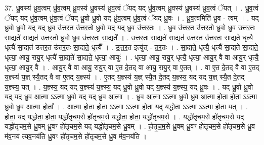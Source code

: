 \documentclass[17pt]{extarticle}
\begin{document}
37. ध्रु॒वस्य॑ ध्रुव॒त्वम् ध्रु॑व॒त्वम् ध्रु॒वस्य॑ ध्रु॒वस्य॑ ध्रुव॒त्वं ॅयद् यद् ध्रु॑व॒त्वम् ध्रु॒वस्य॑ ध्रु॒वस्य॑ ध्रुव॒त्वं ॅयत् । . ध्रु॒व॒त्वं ॅयद् यद् ध्रु॑व॒त्वम् ध्रु॑व॒त्वं ॅयद् ध्रु॒वो ध्रु॒वो यद् ध्रु॑व॒त्वम् ध्रु॑व॒त्वं ॅयद् ध्रु॒वः । . ध्रु॒व॒त्वमिति॑ ध्रुव - त्वम् । . यद् ध्रु॒वो ध्रु॒वो यद् यद् ध्रु॒व उ॑त्तर॒त उ॑त्तर॒तो ध्रु॒वो यद् यद् ध्रु॒व उ॑त्तर॒तः । . ध्रु॒व उ॑त्तर॒त उ॑त्तर॒तो ध्रु॒वो ध्रु॒व उ॑त्तर॒तः सा॒द्यते॑ सा॒द्यत॑ उत्तर॒तो ध्रु॒वो ध्रु॒व उ॑त्तर॒तः सा॒द्यते᳚ । . उ॒त्त॒र॒तः सा॒द्यते॑ सा॒द्यत॑ उत्तर॒त उ॑त्तर॒तः सा॒द्यते॒ धृत्यै॒ धृत्यै॑ सा॒द्यत॑ उत्तर॒त उ॑त्तर॒तः सा॒द्यते॒ धृत्यै᳚ । . उ॒त्त॒र॒त इत्यु॑त् - त॒र॒तः । . सा॒द्यते॒ धृत्यै॒ धृत्यै॑ सा॒द्यते॑ सा॒द्यते॒ धृत्या॒ आयु॒ रायु॒र् धृत्यै॑ सा॒द्यते॑ सा॒द्यते॒ धृत्या॒ आयुः॑ । . धृत्या॒ आयु॒ रायु॒र् धृत्यै॒ धृत्या॒ आयु॒र् वै वा आयु॒र् धृत्यै॒ धृत्या॒ आयु॒र् वै । . आयु॒र् वै वा आयु॒ रायु॒र् वा ए॒त दे॒तद् वा आयु॒ रायु॒र् वा ए॒तत् । . वा ए॒त दे॒तद् वै वा ए॒तद् य॒ज्ञ्स्य॑ य॒ज्ञ् स्यै॒तद् वै वा ए॒तद् य॒ज्ञ्स्य॑ । . ए॒तद् य॒ज्ञ्स्य॑ य॒ज्ञ् स्यै॒त दे॒तद् य॒ज्ञ्स्य॒ यद् यद् य॒ज्ञ् स्यै॒त दे॒तद् य॒ज्ञ्स्य॒ यत् । . य॒ज्ञ्स्य॒ यद् यद् य॒ज्ञ्स्य॑ य॒ज्ञ्स्य॒ यद् ध्रु॒वो ध्रु॒वो यद् य॒ज्ञ्स्य॑ य॒ज्ञ्स्य॒ यद् ध्रु॒वः । . यद् ध्रु॒वो ध्रु॒वो यद् यद् ध्रु॒व आ॒त्मा ऽऽत्मा ध्रु॒वो यद् यद् ध्रु॒व आ॒त्मा । . ध्रु॒व आ॒त्मा ऽऽत्मा ध्रु॒वो ध्रु॒व आ॒त्मा होता॒ होता॒ ऽऽत्मा ध्रु॒वो ध्रु॒व आ॒त्मा होता᳚ । . आ॒त्मा होता॒ होता॒ ऽऽत्मा ऽऽत्मा होता॒ यद् यद्धोता॒ ऽऽत्मा ऽऽत्मा होता॒ यत् । . होता॒ यद् यद्धोता॒ होता॒ यद्धो॑तृचम॒से हो॑तृचम॒से यद्धोता॒ होता॒ यद्धो॑तृचम॒से । . यद्धो॑तृचम॒से हो॑तृचम॒से यद् यद्धो॑तृचम॒से ध्रु॒वम् ध्रु॒वꣳ हो॑तृचम॒से यद् यद्धो॑तृचम॒से ध्रु॒वम् । . हो॒तृ॒च॒म॒से ध्रु॒वम् ध्रु॒वꣳ हो॑तृचम॒से हो॑तृचम॒से ध्रु॒व म॑व॒नय॑ त्यव॒नय॑ति ध्रु॒वꣳ हो॑तृचम॒से हो॑तृचम॒से ध्रु॒व म॑व॒नय॑ति । \newline
\end{document}
